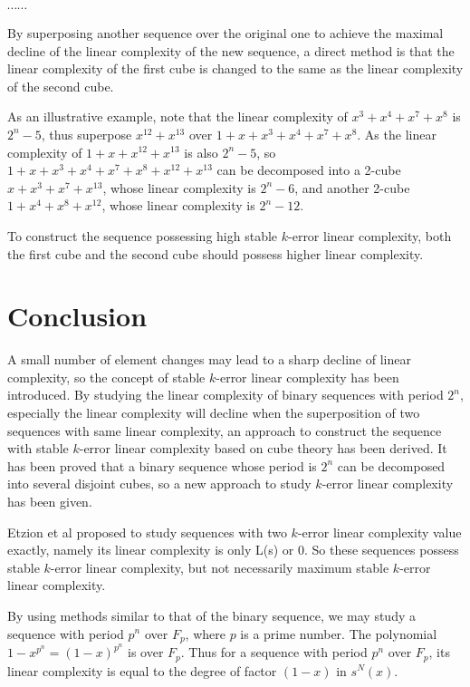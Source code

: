 \documentclass[10pt,conference,twocolumn]{IEEEtran}
\begin{document}
$\cdots \cdots$

By superposing another sequence over the original one to achieve the
maximal decline of the linear complexity of the new sequence, a
direct method is that the linear complexity of the first cube is
changed to the same as the linear complexity of the second cube.

As an illustrative example, note that the linear complexity of
$x^3+x^4+x^7+x^8$ is $2^n -5$, thus superpose $x^{12}+x^{13}$  over
$1+x+x^3+x^4+x^7+x^8$. As the linear complexity of
$1+x+x^{12}+x^{13}$ is also $2^n -5$, so
$1+x+x^3+x^4+x^7+x^8+x^{12}+x^{13}$ can be decomposed into a 2-cube
$x+x^3+x^7+x^{13}$, whose linear complexity is $2^n-6$, and another
2-cube $1+x^4+x^8+x^{12}$, whose linear complexity is $2^n -12$.

To construct the sequence possessing high stable $k$-error linear
complexity, both the first cube and the second cube should possess
higher linear complexity.





\section{Conclusion}

A small number of element changes may lead to a sharp decline of
linear complexity, so the concept of stable $k$-error linear
complexity has been introduced. By studying the linear complexity of
binary sequences with period $2^n$, especially the linear complexity
will decline when the superposition of two sequences with same
linear complexity, an approach to construct the sequence with stable
$k$-error linear complexity based on cube theory has been derived.
It has been proved that a binary sequence whose period is $2^n$ can
be decomposed into several disjoint cubes, so a new approach to
study $k$-error linear complexity has been given.

Etzion et al \cite{Etzion} proposed to study sequences with two
$k$-error linear complexity value exactly, namely its linear
complexity is only L(s) or 0. So these sequences possess stable
$k$-error linear complexity, but not necessarily maximum stable
$k$-error linear complexity.

By using methods similar to that of the binary sequence, we may
study a sequence with period $p^n$ over $F_p$, where $p$ is a prime
number. The polynomial $1-x^{p^n}=(1-x)^{p^n}$ is over $F_p$. Thus
for a sequence with period $p^n$ over $F_p$, its linear complexity
is equal to the degree of factor $(1-x)$ in $s^N(x)$.
\end{document}
